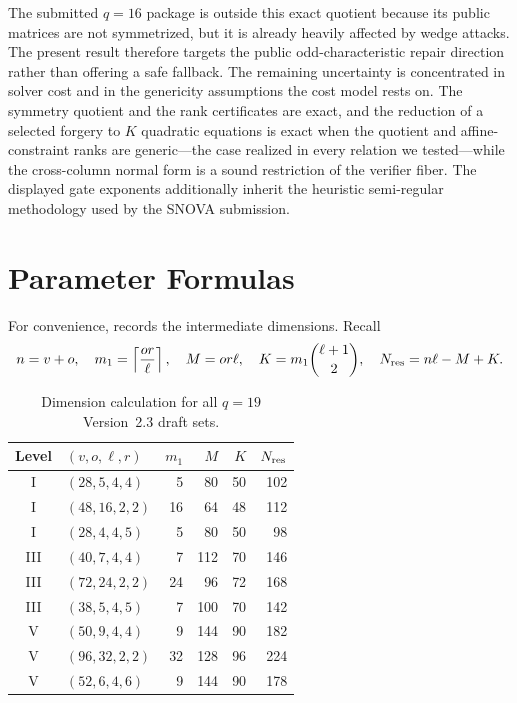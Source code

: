 \documentclass[11pt]{article}
\newcommand{\SNOVA}{\textsf{SNOVA}}
\begin{document}
The submitted $q=16$ package is outside this exact quotient because its public
matrices are not symmetrized, but it is already heavily affected by wedge attacks.
The present result therefore targets the public odd-characteristic repair
direction rather than offering a safe fallback.  The remaining uncertainty is
concentrated in solver cost and in the genericity assumptions the cost model rests
on.  The symmetry quotient and the rank certificates are exact, and the reduction of
a selected forgery to $K$ quadratic equations is exact when the quotient and
affine-constraint ranks are generic---the case realized in every relation we
tested---while the cross-column normal form is a sound restriction of the verifier
fiber.  The displayed gate exponents additionally inherit the heuristic
semi-regular methodology used by the \SNOVA{} submission.

\appendix
\setcounter{section}{0}
\renewcommand{\thesection}{\Alph{section}}
\renewcommand{\theHsection}{app.\Alph{section}}

\section{Parameter Formulas}\label{app:parameters}

For convenience,  records the intermediate dimensions.  Recall
\[
 n=v+o,
 \quad m_1=\left\lceil\frac{or}{\ell}\right\rceil,
 \quad M=or\ell,
 \quad K=m_1\binom{\ell+1}{2},
 \quad N_{\rm res}=n\ell-M+K.
\]

\begin{table}[ht]
\centering
\caption{Dimension calculation for all $q=19$ Version~2.3 draft sets.}\label{tab:params}
\small
\begin{tabular}{@{}c l r r r r@{}}
\toprule
Level & $(v,o,\ell,r)$ & $m_1$ & $M$ & $K$ & $N_{\rm res}$\\
\midrule
I   & $(28,5,4,4)$  & 5  & 80  & 50 & 102\\
I   & $(48,16,2,2)$ & 16 & 64  & 48 & 112\\
I   & $(28,4,4,5)$  & 5  & 80  & 50 & 98\\
III & $(40,7,4,4)$  & 7  & 112 & 70 & 146\\
III & $(72,24,2,2)$ & 24 & 96  & 72 & 168\\
III & $(38,5,4,5)$  & 7  & 100 & 70 & 142\\
V   & $(50,9,4,4)$  & 9  & 144 & 90 & 182\\
V   & $(96,32,2,2)$ & 32 & 128 & 96 & 224\\
V   & $(52,6,4,6)$  & 9  & 144 & 90 & 178\\
\bottomrule
\end{tabular}
\end{table}
\end{document}
